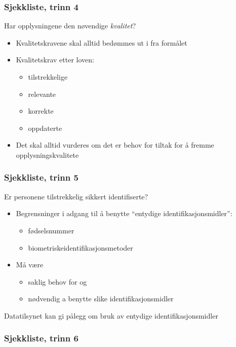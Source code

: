 \documentclass[11pt]{article}
\begin{document}
\subsubsection{Sjekkliste, trinn 4}
\label{sec-17.1.4}

    Har opplysningene den nøvendige \emph{kvalitet}? 
\begin{itemize}
\item Kvalitetskravene skal alltid bedømmes ut i fra formålet
\item Kvalitetskrav etter loven:

\begin{itemize}
\item tilstrekkelige
\item relevante
\item korrekte
\item oppdaterte
\end{itemize}

\item Det skal alltid vurderes om det er behov for tiltak for å fremme opplysningskvalitete
\end{itemize}
\subsubsection{Sjekkliste, trinn 5}
\label{sec-17.1.5}

    Er personene tilstrekkelig sikkert identifiserte?
\begin{itemize}
\item Begrensninger i adgang til å benytte “entydige identifikasjonsmidler”:

\begin{itemize}
\item fødselsnummer
\item biometriskeidentifikasjonsmetoder
\end{itemize}

\item Må være

\begin{itemize}
\item saklig behov for og
\item nødvendig a benytte slike identifikasjonsmidler
\end{itemize}

\end{itemize}
    Datatilsynet kan gi pålegg om bruk av entydige identifikasjonsmidler
\subsubsection{Sjekkliste, trinn 6}
\label{sec-17.1.6}
\end{document}
